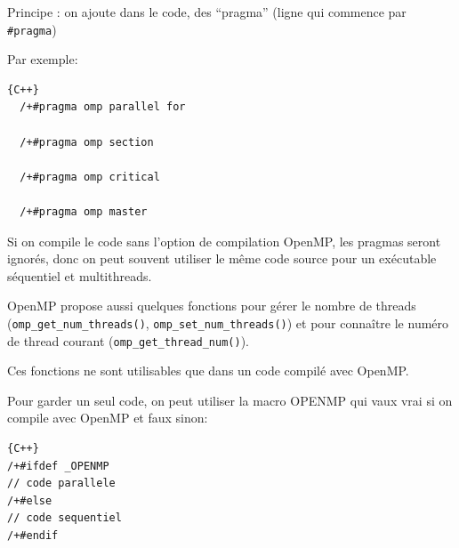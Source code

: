 \documentclass{beamer}
\begin{document}
\begin{frame}[fragile]
Principe : on ajoute dans le code, des ``pragma'' (ligne qui commence par \verb|#pragma|)

\vfill
Par exemple:

\vfill
{}

\begin{lstlisting}{C++}
  /+#pragma omp parallel for

  /+#pragma omp section

  /+#pragma omp critical

  /+#pragma omp master
\end{lstlisting}

\vfill
Si on compile le code sans l'option de compilation OpenMP, les pragmas seront ignorés, donc on peut souvent utiliser le même code source pour un exécutable séquentiel et multithreads.   

\end{frame}

\begin{frame}[fragile]

OpenMP propose aussi quelques fonctions pour gérer le nombre de threads (\verb|omp_get_num_threads()|, \verb|omp_set_num_threads()|) et pour connaître le numéro de thread courant (\verb|omp_get_thread_num()|).

\vfill Ces fonctions ne sont utilisables que dans un code compilé avec OpenMP.

Pour garder un seul code, on peut utiliser la macro {\textunderscore}OPENMP qui vaux vrai si on compile avec OpenMP et faux sinon:
\begin{center}
\begin{lstlisting}{C++}
/+#ifdef _OPENMP
// code parallele
/+#else
// code sequentiel
/+#endif
\end{lstlisting}
\end{center}

\end{frame}
\end{document}
